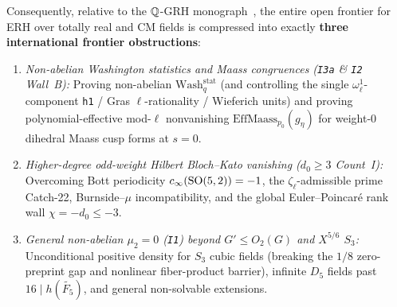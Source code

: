 Consequently, relative to the $\mathbb{Q}$-GRH monograph~\cite{Alpoge2026}, the entire open frontier for ERH over totally real and CM fields is compressed into exactly \textbf{three international frontier obstructions}:
\begin{enumerate}[label=\textbf{Frontier~\arabic*.}]
\item \emph{Non-abelian Washington statistics and Maass congruences (\texttt{I3a} \& \texttt{I2} Wall~B):} Proving non-abelian $\mathrm{Wash}_q^{\mathrm{stat}}$ (and controlling the single $\omega_\ell^1$-component \texttt{h1} / Gras $\ell$-rationality / Wieferich units) and proving polynomial-effective mod-$\ell$ nonvanishing $\mathrm{EffMaass}_{p_0}(g_\eta)$ for weight-$0$ dihedral Maass cusp forms at $s=0$.
\item \emph{Higher-degree odd-weight Hilbert Bloch--Kato vanishing ($d_0 \ge 3$ Count~I):} Overcoming Bott periodicity $c_\infty(\mathrm{SO}(5,2)) = -1$, the $\zeta_\ell$-admissible prime Catch-22, Burnside--$\mu$ incompatibility, and the global Euler--Poincar\'e rank wall $\chi = -d_0 \le -3$.
\item \emph{General non-abelian $\mu_2 = 0$ (\texttt{I1}) beyond $G' \le O_2(G)$ and $X^{5/6}$ $S_3$:} Unconditional positive density for $S_3$ cubic fields (breaking the $1/8$ zero-preprint gap and nonlinear fiber-product barrier), infinite $D_5$ fields past $16 \mid h(\widetilde{F_5})$, and general non-solvable extensions.
\end{enumerate}
